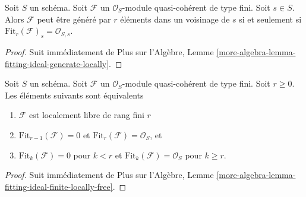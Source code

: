 \begin{lemma}
\label{lemma-fitting-ideal-generate-locally}
Soit  $S$  un schéma. Soit  $\mathcal{F}$  un  $\mathcal{O}_S$-module
quasi-cohérent de type fini. Soit  $s \in S$. Alors  $\mathcal{F}$  peut être
généré par  $r$  éléments dans un voisinage de  $s$  si et seulement
si  $\text{Fit}_r(\mathcal{F})_s = \mathcal{O}_{S, s}$.
\end{lemma}

\begin{proof}
Suit immédiatement de Plus sur l’Algèbre, Lemme  \ref{more-algebra-lemma-fitting-ideal-generate-locally}.
\end{proof}

\begin{lemma}
\label{lemma-fitting-ideal-finite-locally-free}
Soit  $S$  un schéma. Soit  $\mathcal{F}$  un  $\mathcal{O}_S$-module
quasi-cohérent de type fini. Soit  $r \geq 0$. Les éléments suivants sont
équivalents
\begin{enumerate}
\item $\mathcal{F}$  est localement libre de rang fini  $r$
\item $\text{Fit}_{r - 1}(\mathcal{F}) = 0$  et  $\text{Fit}_r(\mathcal{F}) = \mathcal{O}_S$, et
\item $\text{Fit}_k(\mathcal{F}) = 0$  pour  $k < r$  et  $\text{Fit}_k(\mathcal{F}) = \mathcal{O}_S$  pour  $k \geq r$.
\end{enumerate}
\end{lemma}

\begin{proof}
Suit immédiatement de Plus sur l’Algèbre, Lemme  \ref{more-algebra-lemma-fitting-ideal-finite-locally-free}.
\end{proof}

